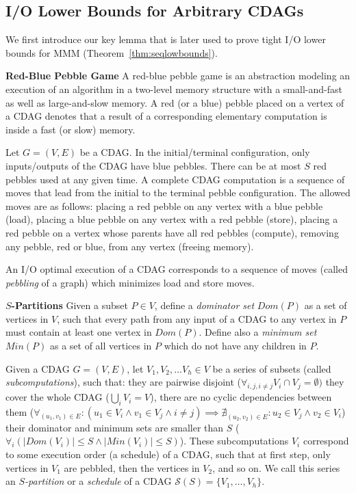 \documentclass[sigplan,review,anonymous,10pt]{acmart}\settopmatter{printfolios=true,printccs=false,printacmref=false}
\newcommand\greg[1]{\textcolor{blue}{[Greg: #1]}}
\newcommand\mac[1]{\textcolor{red}{[Mac: #1]}}
\newtheorem{defn}{Definition}
\newcommand{\macb}[1]{\textbf{\textsf{#1}}}
\begin{document}
\subsection{I/O Lower Bounds for Arbitrary CDAGs}
\label{sec:iolowerbounds}

We first introduce our key lemma that is later used to prove tight I/O lower 
bounds for 
MMM
(Theorem~\ref{thm:seqlowbounds}). 

\macb{Red-Blue Pebble Game} A red-blue pebble game is an abstraction modeling
an execution of an algorithm in a two-level memory structure with a
small-and-fast as well as large-and-slow memory. A red (or a blue) pebble
placed on a vertex of a CDAG denotes that a result of a corresponding 
elementary computation is inside
a fast (or slow) memory. 

	Let $G = (V,E)$ be a CDAG. 
	In the initial/terminal configuration, only inputs/outputs of the CDAG have
	blue pebbles.
	There can be at most $S$ red pebbles used at any given time. A complete 
	CDAG computation is a
	sequence of moves that lead from the initial to the terminal pebble
	configuration.
  The allowed moves are as follows:  placing a red pebble on any
  vertex with a blue pebble (load),  placing a blue pebble on any
  vertex with a red pebble (store),  placing a red pebble on a vertex
  whose parents have all red pebbles (compute),  removing any pebble, 
  red or blue, from any vertex (freeing memory).

An I/O optimal execution of a CDAG corresponds to a sequence of moves (called 
\emph{pebbling} of a graph) which minimizes load  and store 
 moves.

\macb{$S$-Partitions}
%
Given a subset $P \in V$, define a \emph{dominator set} $Dom(P)$ as a set of 
vertices in $V$, such that every path from any input of a 
CDAG to any vertex in $P$ must contain at least one vertex in $Dom(P)$. Define 
also a \emph{minimum set} $Min(P)$ as a set of all vertices in $P$ which do not 
have any children in $P$.

Given a CDAG $G = (V,E)$, let $V_1, V_2, \dots V_h \in V$ be a series of 
subsets (called \emph{subcomputations}), such that:  they are 
pairwise disjoint ($\forall_{i,j, i \ne j}V_i \cap V_j = \emptyset )$ 
 they cover the whole CDAG ($\bigcup_i V_i = V$),  
there are no cyclic dependencies between them ($\forall_{(u_1,v_1) \in E}: (u_1 
\in V_i \land v_1 \in V_j  \land i \ne j) \implies \nexists_{(u_2,v_2) \in E}: 
u_2 \in V_j \land v_2 \in V_i$)  their dominator and minimum sets are 
smaller than $S$ ($\forall_i (|Dom(V_i)| \le S \land |Min(V_i)| \le S)$).
These subcomputations $V_i$ correspond to some execution order (a schedule) of 
a CDAG, such that at first step, only vertices in $V_1$ are pebbled, then the 
vertices in $V_2$, and so on. We call this series an \emph{$S$-partition} or a 
\emph{schedule} of a 
CDAG $\mathcal{S}(S) = \{V_1, \dots, V_h\}$.
\end{document}
